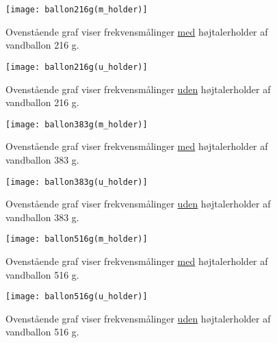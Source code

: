 \begin{figure}[htbp]
  \begin{minipage}[b]{1\linewidth}
    \centering
    \texttt{[image: ballon216g(m\_holder)]}
    \caption{Ovenstående graf viser frekvensmålinger \underline{med} højtalerholder af vandballon 216 g.}
    \label{fig:ballon216g(m_holder)}
  \end{minipage}
  \hspace{1cm}
  \begin{minipage}[b]{1\linewidth}
    \centering
    \texttt{[image: ballon216g(u\_holder)]}
    \caption{Ovenstående graf viser frekvensmålinger \underline{uden} højtalerholder af vandballon 216 g.}
    \label{fig:ballon216g(u_holder)}
  \end{minipage}
\end{figure}

\begin{figure}[htbp]
  \begin{minipage}[b]{1\linewidth}
    \centering
    \texttt{[image: ballon383g(m\_holder)]}
    \caption{Ovenstående graf viser frekvensmålinger \underline{med} højtalerholder af vandballon 383 g.}
    \label{fig:ballon383g(m_holder)}
  \end{minipage}
  \hspace{1cm}
  \begin{minipage}[b]{1\linewidth}
    \centering
    \texttt{[image: ballon383g(u\_holder)]}
    \caption{Ovenstående graf viser frekvensmålinger \underline{uden} højtalerholder af vandballon 383 g.}
    \label{fig:ballon383g(u_holder)}
  \end{minipage}
\end{figure}

\begin{figure}[htbp]
  \begin{minipage}[b]{1\linewidth}
    \centering
    \texttt{[image: ballon516g(m\_holder)]}
    \caption{Ovenstående graf viser frekvensmålinger \underline{med} højtalerholder af vandballon 516 g.}
    \label{fig:ballon516g(m_holder)}
  \end{minipage}
  \hspace{1cm}
  \begin{minipage}[b]{1\linewidth}
    \centering
    \texttt{[image: ballon516g(u\_holder)]}
    \caption{Ovenstående graf viser frekvensmålinger \underline{uden} højtalerholder af vandballon 516 g.}
    \label{fig:ballon516g(u_holder)}
  \end{minipage}
\end{figure}




